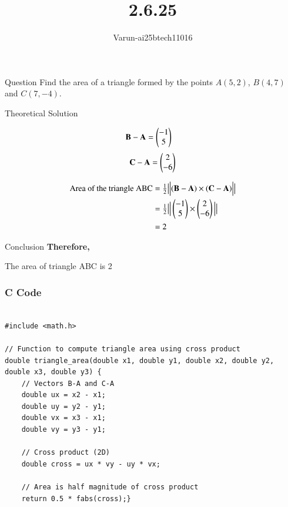 \documentclass{beamer}
\title %
{2.6.25}
\author %
{Varun-ai25btech11016}
\begin{document}
\frame{\titlepage}
\begin{frame}{Question}
Find the area of a triangle formed by the points  $A(5,2)$, $B(4,7)$ and $C(7,-4)$.

\end{frame}



\begin{frame}{Theoretical Solution }

 \begin{align}
\mathbf{B - A} &= \begin{pmatrix}-1 \\ 5\end{pmatrix}
\end{align}
\begin{align}
\mathbf{C - A} = \begin{pmatrix}2 \\ -6\end{pmatrix} 
\end{align}

\begin{align}
\text{Area of the triangle ABC} &= \tfrac{1}{2} \big| \Big| (\mathbf{B - A}) \times (\mathbf{C - A}) \Big| \big| \\
&= \tfrac{1}{2} \big|  \Big| \begin{pmatrix}-1 \\ 5 \end{pmatrix} \times \begin{pmatrix}2 \\ -6 \end{pmatrix} \Big| \big| \nonumber\\
&=2 \nonumber
\end{align}
\end{frame}
\begin{frame}{Conclusion}
\textbf{Therefore,
}
\begin{center}
    The area of triangle ABC is 2
\end{center}
\end{frame}
\begin{frame}[fragile]
    \frametitle{C Code}
\begin{lstlisting}

#include <math.h>

// Function to compute triangle area using cross product
double triangle_area(double x1, double y1, double x2, double y2, double x3, double y3) {
    // Vectors B-A and C-A
    double ux = x2 - x1;
    double uy = y2 - y1;
    double vx = x3 - x1;
    double vy = y3 - y1;

    // Cross product (2D)
    double cross = ux * vy - uy * vx;

    // Area is half magnitude of cross product
    return 0.5 * fabs(cross);}

\end{lstlisting}
\end{frame}
\end{document}

